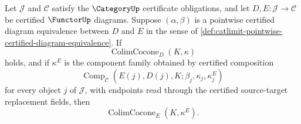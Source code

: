 \begin{theorem}
\label{thm:catcolimit-transport-pointwise-certified-diagram-equivalence}
Let $\mathcal J$ and $\mathcal C$ satisfy the $\CategoryUp$ certificate obligations, and let $D,E:\mathcal J\to\mathcal C$ be certified $\FunctorUp$ diagrams. Suppose $(\alpha,\beta)$ is a pointwise certified diagram equivalence between $D$ and $E$ in the sense of \autoref{def:catlimit-pointwise-certified-diagram-equivalence}. If
$$
\operatorname{ColimCocone}_{D}(K,\kappa)
$$
holds, and if $\kappa^E$ is the component family obtained by certified composition
$$
\operatorname{Comp}_{\mathcal C}(E(j),D(j),K;\beta_j,\kappa_j,\kappa^E_j)
$$
for every object $j$ of $\mathcal J$, with endpoints read through the certified source-target replacement fields, then
$$
\operatorname{ColimCocone}_{E}(K,\kappa^E).
$$
\end{theorem}
